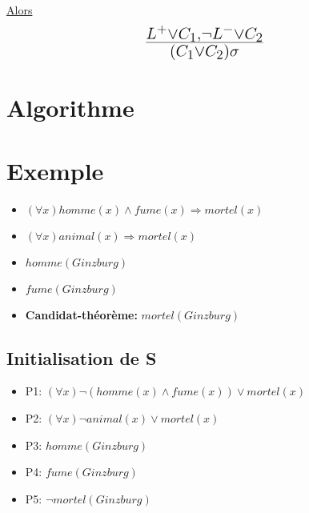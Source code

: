\underline{Alors} $$ \mbox{\huge $\frac{L^{+} \vee C_1, \neg L^{-} \vee C_2}{(C_1 \vee C_2)\sigma}$ } $$

\section{Algorithme}
\begin{algorithm}
\end{algorithm}

\section{Exemple}
\begin{itemize}
  \item $(\forall x) homme(x) \wedge fume(x) \Rightarrow mortel(x)$
  \item $(\forall x) animal(x) \Rightarrow mortel(x)$
  \item $homme(Ginzburg)$
  \item $fume(Ginzburg)$
  \item \textbf{Candidat-théorème:} $mortel(Ginzburg)$
\end{itemize}

\subsection{Initialisation de S}
\begin{itemize}
  \item P1: $(\forall x) \neg (homme(x)\wedge fume(x)) \vee mortel(x)$
  \item P2: $(\forall x) \neg animal(x) \vee mortel(x)$
  \item P3: $homme(Ginzburg)$
  \item P4: $fume(Ginzburg)$
  \item P5: $\neg mortel(Ginzburg)$
\end{itemize}

